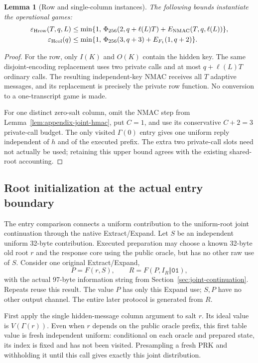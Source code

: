 \documentclass[pdflatex]{sn-jnl}
\theoremstyle{thmstyleone}
\newtheorem{lemma}[theorem]{Lemma}
\theoremstyle{thmstylethree}
\theoremstyle{thmstyletwo}
\begin{document}
\begin{lemma}[Row and single-column instances]
\label{lem:appendix-hmac-instances}
The following bounds instantiate the operational games:
\begin{align}
 \varepsilon_{\rm Hrow}(T,q,L)
 &\le\min\{1,\,
 \Phi_{256}(2,q+\ell(L)T)+E_{\rm NMAC}(T,q,\ell(L))\},
 \label{eq:appendix-multirow}\\
 \varepsilon_{\rm Hcol}(q)
 &\le\min\{1,\,
 \Phi_{256}(3,q+3)+E_{F_1}(1,q+2)\}.
 \label{eq:appendix-single-column}
\end{align}
\end{lemma}
\begin{proof}
For the row, only $I(K)$ and $O(K)$ contain the hidden key.
The same disjoint-encoding replacement uses two private calls and at most
$q+\ell(L)T$ ordinary calls. The resulting independent-key NMAC receives
all $T$ adaptive messages, and its replacement is precisely the private
row function. No conversion to a one-transcript game is made.

For one distinct zero-salt column, omit the NMAC step from
Lemma~\ref{lem:appendix-joint-hmac}, put $C=1$, and use its conservative
$C+2=3$ private-call budget. The only visited $\Gamma(0)$ entry gives one
uniform reply independent of $h$ and of the executed prefix. The extra
two private-call slots need not actually be used; retaining this upper
bound agrees with the existing shared-root accounting.
\end{proof}

\subsection{Root initialization at the actual entry boundary}
\label{app:joint-root-entry}

The entry comparison connects a uniform contribution to the uniform-root
joint continuation through the native Extract/Expand. Let $S$ be an
independent uniform 32-byte contribution. Executed
preparation may choose a known 32-byte old root $r$ and the response
core using the public oracle, but has no other raw use of $S$. Consider
one original Extract/Expand,
\[
 P=F(r,S),\qquad R=F(P,I_R\Vert\mathtt{01}),
\]
with the actual 97-byte information string from
Section~\ref{sec:joint-continuation}. Repeats reuse this result.
The value $P$ has only this Expand use; $S,P$ have no other output
channel. The entire later protocol is generated from $R$.

First apply the single hidden-message column argument to salt $r$.
Its ideal value is $V(\Gamma(r))$. Even when $r$ depends on the public
oracle prefix, this first table value is fresh independent uniform:
conditional on each oracle and prepared state, its index is fixed and
has not been visited. Presampling a fresh PRK and withholding it until
this call gives exactly this joint distribution.
\end{document}
